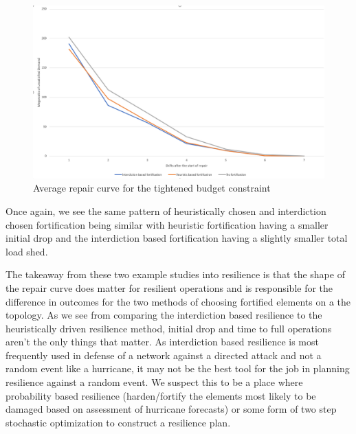 \documentclass{article}
\begin{document}
\begin{figure}[htbp]
	\centering
	\includegraphics[width=.9\linewidth]{LowBudgetSpaghetti.png}
	\caption{Average repair curve for the tightened budget constraint}
\end{figure}
	 \begin{table}[htbp]
	\centering
	\caption{Average unsatisfied demand by shift by resilience methods}
	\label{time}
\end{table}

Once again, we see the same pattern of heuristically chosen and interdiction chosen fortification being similar with heuristic fortification having a smaller initial drop and the interdiction based fortification having a slightly smaller total load shed.  

The takeaway from these two example studies into resilience is that the shape of the repair curve does matter for resilient operations and is responsible for the difference in outcomes for the two methods of choosing fortified elements on a the topology. As we see from comparing the interdiction based resilience to the heuristically driven resilience method, initial drop and time to full operations aren't the only things that matter. As interdiction based resilience is most frequently used in defense of a network against a directed attack and not a random event like a hurricane, it may not be the best tool for the job in planning resilience against a random event. We suspect this to be a place where probability based resilience (harden/fortify the elements most likely to be damaged based on assessment of hurricane forecasts) or some form of two step stochastic optimization to construct a resilience plan. 
\end{document}
